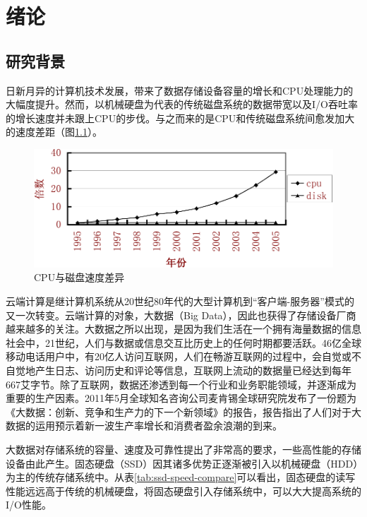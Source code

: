 
\chapter{绪论}
\label{cha:introduction}

\section{研究背景}
\label{sec:background}

日新月异的计算机技术发展，带来了数据存储设备容量的增长和CPU处理能力的大幅度提升。然而，以机械硬盘为代表的传统磁盘系统的数据带宽以及I/O吞吐率的增长速度并未跟上CPU的步伐。与之而来的是CPU和传统磁盘系统间愈发加大的速度差距\cite{matthews2008intelturbomem}（图\ref{fig:cpu-disk-diff}）。

\begin{figure}[H]
\centering
\includegraphics[width=0.7\linewidth]{./graph/cpu-disk-gap}
\caption{CPU与磁盘速度差异}
\label{fig:cpu-disk-diff}
\end{figure}

云端计算\cite{jimgray2003cloud}是继计算机系统从20世纪80年代的大型计算机到“客户端-服务器”模式的又一次转变。云端计算的对象，大数据（Big Data），因此也获得了存储设备厂商越来越多的关注。大数据之所以出现，是因为我们生活在一个拥有海量数据的信息社会中，21世纪，人们与数据或信息交互比历史上的任何时期都要活跃。46亿全球移动电话用户中，有20亿人访问互联网，人们在畅游互联网的过程中，会自觉或不自觉地产生日志、访问历史和评论等信息，互联网上流动的数据量已经达到每年667艾字节。除了互联网，数据还渗透到每一个行业和业务职能领域，并逐渐成为重要的生产因素。2011年5月全球知名咨询公司麦肯锡全球研究院发布了一份题为《大数据：创新、竞争和生产力的下一个新领域》的报告，报告指出了人们对于大数据的运用预示着新一波生产率增长和消费者盈余浪潮的到来。

大数据对存储系统的容量、速度及可靠性提出了非常高的要求，一些高性能的存储设备由此产生。固态硬盘（SSD）因其诸多优势正逐渐被引入以机械硬盘（HDD）为主的传统存储系统中\cite{morris2003evostorage}。从表\ref{tab:ssd-speed-compare}可以看出，固态硬盘的读写性能远远高于传统的机械硬盘\cite{libo2010cacheforssd}，将固态硬盘引入存储系统中，可以大大提高系统的I/O性能。

